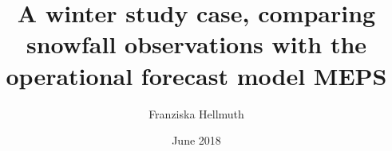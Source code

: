 \makeatletter
\title{A winter study case, comparing snowfall observations with the operational forecast model MEPS}	\let\Title\@title
\author{Franziska Hellmuth}	\let\Author\@author
\date{June 2018}		\let\Date\@date
\makeatother